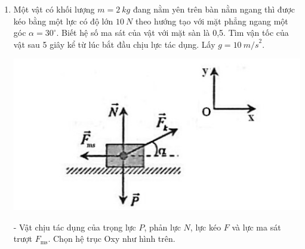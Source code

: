 \begin{enumerate}[label=\bfseries Bài \arabic*:,leftmargin=1.5cm]
	
	\item {}
	
	
	{
		Một vật có khối lượng $m= \SI{2}{kg}$ đang nằm yên trên bàn nằm ngang thì được kéo bằng một lực có độ lớn $\SI{10}{N}$ theo hướng tạo với mặt phẳng ngang một góc $\alpha = 30^\circ$. Biết hệ số ma sát của vật với mặt sàn là 0,5. Tìm vận tốc của vật sau 5 giây kể từ lúc bắt đầu chịu lực tác dụng. Lấy $g = \SI{10}{m/s}^2.$
	}
	
	\hideall
	{
		\begin{center}
			\includegraphics[scale=0.6]{../figs/VN10-2022-PH-TP021-7.jpg}
		\end{center}
		- Vật chịu tác dụng của trọng lực $P$, phản lực $N$, lực kéo $F$ và lực ma sát trượt $F_\text{ms}$. Chọn hệ trục Oxy như hình trên.
		
}
\end{enumerate}
